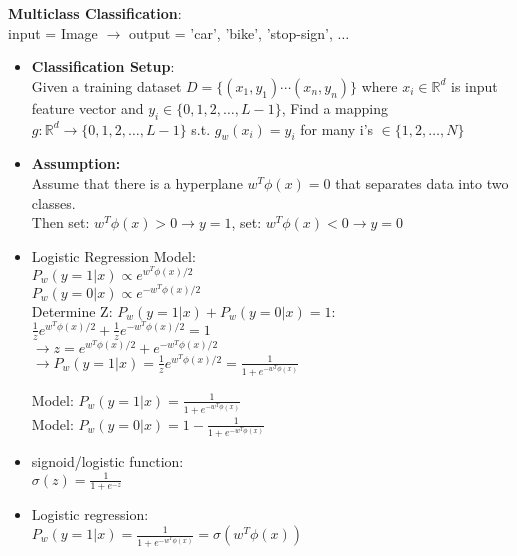 \documentclass[12pt]{article}
\begin{document}
        \textbf{Multiclass Classification}:\\
        input = Image $\rightarrow$ output = 'car', 'bike', 'stop-sign', $\dots$
        \begin{itemize}
            \item \textbf{Classification Setup}:\\
            Given a training dataset $D=\{(x_1, y_1) \cdots (x_n, y_n)\}$ where $x_i \in \mathbb{R}^d$ is input feature vector and $y_i\in \{0,1,2,\dots, L-1\}$, Find a mapping $g:\mathbb{R}^d \rightarrow \{0,1,2,\dots, L-1\}$ s.t. $g_w(x_i) = y_i$ for many i's $\in \{1,2,\dots, N\}$ 
            \item \textbf{Assumption:}\\
            Assume that there is a hyperplane $w^T\phi(x) =0$ that separates data into two classes. \\
            Then set: $w^T\phi(x) > 0 \rightarrow y = 1$, set: $w^T\phi(x) < 0 \rightarrow y = 0$

            \item Logistic Regression Model:\\
            $P_w(y = 1 | x) \propto e^{w^T\phi(x)/2}$\\
            $P_w(y = 0 | x) \propto e^{-w^T\phi(x)/2}$\\
            Determine Z: $P_w(y = 1 | x) + P_w(y = 0 | x) = 1$:\\
            $\frac{1}{z}e^{w^T\phi(x)/2} + \frac{1}{z} e^{-w^T\phi(x)/2} = 1$\\
            $\rightarrow z = e^{w^T\phi(x)/2} + e^{-w^T\phi(x)/2}$\\
            $\rightarrow P_w(y = 1 | x) = \frac{1}{z}e^{w^T\phi(x)/2} = \frac{1}{1 + e^{-w^T\phi(x)}}$

            Model: $P_w(y = 1 | x) = \frac{1}{1 + e^{-w^T\phi(x)}}$\\
            Model: $P_w(y = 0 | x) = 1- \frac{1}{1 + e^{-w^T\phi(x)}}$
            \item signoid/logistic function:\\
            $\sigma(z) = \frac{1}{1 + e^{-z}}$
            \item Logistic regression:\\
            $P_w(y = 1 | x) = \frac{1}{1 + e^{-w^T\phi(x)}} = \sigma(w^T\phi(x))$


\end{itemize}
\end{document}
